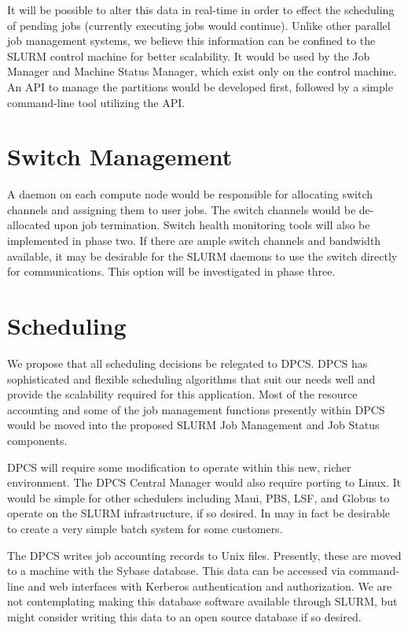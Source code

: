 It will be possible to alter this data in real-time in order to effect the
scheduling of pending jobs (currently executing jobs would continue). Unlike
other parallel job management systems, we believe this information can be
confined to the SLURM control machine for better scalability. It would be used
by the Job Manager and Machine Status Manager, which exist only on the control
machine. An API to manage the partitions would be developed first, followed by
a simple command-line tool utilizing the API.

\section{Switch Management}

A daemon on each compute node would be responsible for allocating switch
channels and assigning them to user jobs. The switch channels would be
de-allocated upon job termination. Switch health monitoring tools will 
also be implemented in phase two. If there are ample switch channels and
bandwidth available, it may be desirable for the SLURM daemons to use the
switch directly for communications. This option will be investigated in phase
three. 

\section{Scheduling}

We propose that all scheduling decisions be relegated to DPCS. DPCS has
sophisticated and flexible scheduling algorithms that suit our needs well and
provide the scalability required for this application. Most of the resource
accounting and some of the job management functions presently within DPCS would
be moved into the proposed SLURM Job Management and Job Status components. 

DPCS will require some modification to operate within this new, richer
environment. The DPCS Central Manager would also require porting to Linux. It
would be simple for other schedulers including Maui, PBS, LSF, and Globus 
to operate on the SLURM infrastructure, if so desired. In may in fact be 
desirable to create a very simple batch system for some customers.

The DPCS writes job accounting records to Unix files. Presently, these are
moved to a machine with the Sybase database. This data can be accessed via
command-line and web interfaces with Kerberos authentication and authorization.
We are not contemplating making this database software available through SLURM,
but might consider writing this data to an open source database if so desired.

